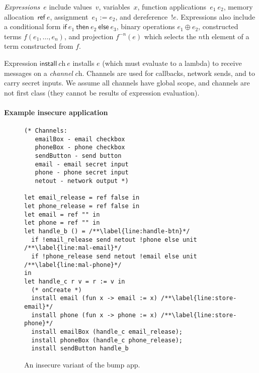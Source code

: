 \documentclass[10pt,conference,compsocconf]{IEEEtran}
\newcommand{\sfmt}[1]{\textsf{#1}}
\newcommand{\sch}{\textit{ch}}
\newcommand{\sassign}[2]{#1 := #2}
\newcommand{\sderef}[1]{!#1}
\newcommand{\sif}[3]{\sfmt{if}~#1~\sfmt{then}~#2~\sfmt{else}~#3}
\newcommand{\sinstall}[2]{\sfmt{install}~#1~#2}
\newcommand{\sref}[1]{\sfmt{ref}~#1}
\begin{document}
\emph{Expressions}~$e$ include values~$v$, variables~$x$,
function applications~$e_1~e_2$, memory
allocation~$\sref{e}$, assignment~$\sassign{e_1}{e_2}$, and
dereference~$\sderef{e}$. Expressions also include a conditional form
$\sif{e_1}{e_2}{e_3}$, binary operations $e_1\oplus e_2$, constructed
terms $f(e_1, \ldots, e_n)$, and projection $f^{-n}(e)$ which selects the
$n$th element of a term constructed from $f$.

Expression $\sinstall{\sch}{e}$ installs $e$ (which must evaluate to a
lambda) to receive messages on a \emph{channel} $\sch$. Channels are
used for callbacks, network sends, and to carry secret inputs. We assume
all channels have global scope, and channels are not first class
(they cannot be results of expression evaluation).

\paragraph*{Example insecure application}

\begin{figure}[t!]
  \lstset{language=Caml}
  \begin{lstlisting}[name=Ex]
(* Channels:
   emailBox - email checkbox
   phoneBox - phone checkbox
   sendButton - send button
   email - email secret input
   phone - phone secret input
   netout - network output *)

let email_release = ref false in
let phone_release = ref false in
let email = ref "" in
let phone = ref "" in
let handle_b () = /**\label{line:handle-btn}*/
  if !email_release send netout !phone else unit /**\label{line:mal-email}*/
  if !phone_release send netout !email else unit /**\label{line:mal-phone}*/
in
let handle_c r v = r := v in
  (* onCreate *)
  install email (fun x -> email := x) /**\label{line:store-email}*/
  install phone (fun x -> phone := x) /**\label{line:store-phone}*/
  install emailBox (handle_c email_release);
  install phoneBox (handle_c phone_release);
  install sendButton handle_b
\end{lstlisting}
  \caption{An insecure variant of the bump app.}
  \label{fig:evilappexample}
\end{figure}
\end{document}
